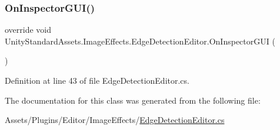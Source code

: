 \subsubsection{\texorpdfstring{On\+Inspector\+G\+U\+I()}{OnInspectorGUI()}}
{\footnotesize\ttfamily override void Unity\+Standard\+Assets.\+Image\+Effects.\+Edge\+Detection\+Editor.\+On\+Inspector\+G\+UI (\begin{DoxyParamCaption}{ }\end{DoxyParamCaption})}



Definition at line 43 of file Edge\+Detection\+Editor.\+cs.



The documentation for this class was generated from the following file\+:\begin{DoxyCompactItemize}
\item 
Assets/\+Plugins/\+Editor/\+Image\+Effects/\mbox{\hyperlink{_edge_detection_editor_8cs}{Edge\+Detection\+Editor.\+cs}}\end{DoxyCompactItemize}
